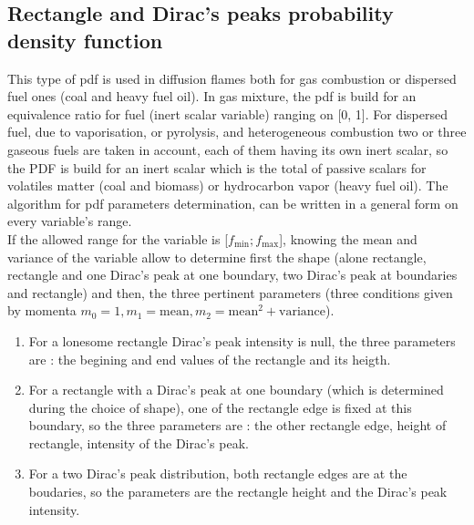 \subsection*{Rectangle and Dirac's peaks probability density function}
 
This type of pdf is used in diffusion flames both for gas combustion or
dispersed fuel ones (coal and heavy fuel oil). In gas mixture, the pdf is build
for an equivalence ratio for fuel (inert scalar variable) ranging on [0, 1]. For
dispersed fuel, due to vaporisation, or pyrolysis, and heterogeneous combustion
two or three gaseous fuels are taken in account, each of them having its own
inert scalar, so the PDF is build for an inert scalar which is the total of
passive scalars for volatiles matter (coal and biomass) or hydrocarbon vapor
(heavy
fuel oil). The algorithm for pdf parameters determination, can be written in a general form on every variable's range.\\
If the allowed range for the variable is [$f_{\min} ; f_{\max}$], knowing the
mean and variance of the variable allow to determine first the shape (alone
rectangle, rectangle and one Dirac's peak at one boundary, two Dirac's peak at
boundaries and rectangle) and then, the three pertinent parameters (three
conditions given by momenta $m_{0}=1, m_{1}=\text{mean},
m_{2}=\text{mean}^{2}+\text{variance}$).
  
\begin{enumerate}
\item For a lonesome rectangle Dirac's peak intensity is null, the three
  parameters are : the begining and end values of the rectangle and its heigth.
\item For a rectangle with a Dirac's peak at one boundary (which is determined
  during the choice of shape), one of the rectangle edge is fixed at this
  boundary, so the three parameters are : the other rectangle edge, height of
  rectangle, intensity of the Dirac's peak.
\item For a two Dirac's peak distribution, both rectangle edges are at the
  boudaries, so the parameters are the rectangle height and the Dirac's peak
  intensity.
\end{enumerate}

